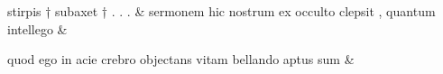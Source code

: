 \documentclass[12pt,onecolumn,twoside,a4paper]{memoir}
\begin{document}
\begin{pairs}
\begin{Leftside}
                              stirpis
                              †
                              subaxet
                              †
                              .
                              .
                              . \&
                         \stanza {}
                     sermonem
                              hic
                              nostrum
                              ex
                              occulto
                              clepsit
                              ,
                              quantum
                              intellego \&
                         \stanza {}
                     
                              quod
                              ego
                              in
                              acie
                              crebro
                              objectans
                              vitam
                              bellando
                              aptus
                              sum \&
                         \stanza {}
                     

\end{Leftside}
\end{pairs}
\end{document}
